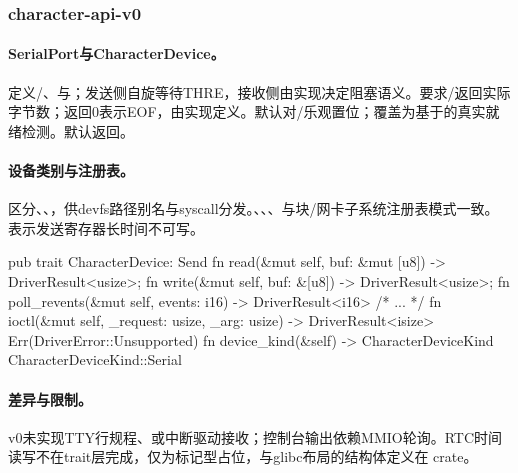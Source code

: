 
\subsubsection{character-api-v0}

\paragraph{SerialPort与CharacterDevice。}定义/、与；发送侧自旋等待THRE，接收侧由实现决定阻塞语义。要求/返回实际字节数；返回0表示EOF，由实现定义。默认对/乐观置位；覆盖为基于的真实就绪检测。默认返回。

\paragraph{设备类别与注册表。}区分、、，供devfs路径别名与syscall分发。、、、与块/网卡子系统注册表模式一致。表示发送寄存器长时间不可写。

\begin{rustcode}
pub trait CharacterDevice: Send {
    fn read(&mut self, buf: &mut [u8]) -> DriverResult<usize>;
    fn write(&mut self, buf: &[u8]) -> DriverResult<usize>;
    fn poll_revents(&mut self, events: i16) -> DriverResult<i16> { /* ... */ }
    fn ioctl(&mut self, _request: usize, _arg: usize) -> DriverResult<isize> {
        Err(DriverError::Unsupported)
    }
    fn device_kind(&self) -> CharacterDeviceKind {
        CharacterDeviceKind::Serial
    }
}
\end{rustcode}

\paragraph{差异与限制。}v0未实现TTY行规程、或中断驱动接收；控制台输出依赖MMIO轮询。RTC时间读写不在trait层完成，仅为标记型占位，与glibc布局的结构体定义在 crate。
